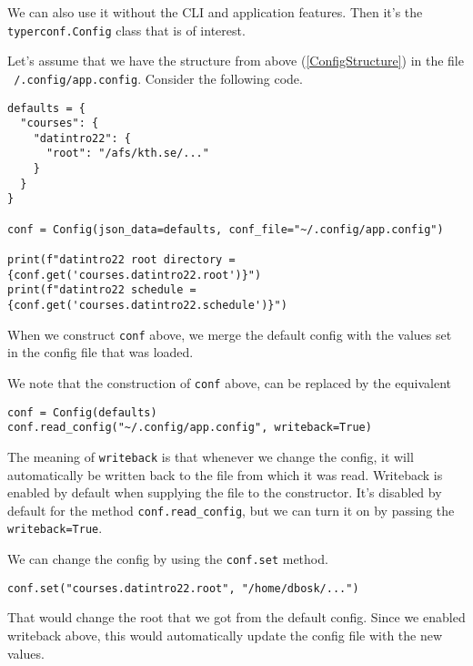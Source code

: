 We can also use it without the CLI and application features.
Then it's the \texttt{typerconf.Config} class that is of interest.

Let's assume that we have the structure from above (\cref{ConfigStructure}) in 
the file \texttt{~/.config/app.config}.
Consider the following code.
\begin{verbatim}
defaults = {
  "courses": {
    "datintro22": {
      "root": "/afs/kth.se/..."
    }
  }
}

conf = Config(json_data=defaults, conf_file="~/.config/app.config")

print(f"datintro22 root directory = {conf.get('courses.datintro22.root')}")
print(f"datintro22 schedule = {conf.get('courses.datintro22.schedule')}")
\end{verbatim}
When we construct \texttt{conf} above, we merge the default config 
with the values set in the config file that was loaded.

We note that the construction of \texttt{conf} above, can be 
replaced by the equivalent
\begin{verbatim}
conf = Config(defaults)
conf.read_config("~/.config/app.config", writeback=True)
\end{verbatim}
The meaning of \texttt{writeback} is that whenever we change the 
config, it will automatically be written back to the file from which it was 
read.
Writeback is enabled by default when supplying the file to the constructor.
It's disabled by default for the method \texttt{conf.read_config}, 
but we can turn it on by passing the \texttt{writeback=True}.

We can change the config by using the \texttt{conf.set} method.
\begin{verbatim}
conf.set("courses.datintro22.root", "/home/dbosk/...")
\end{verbatim}
That would change the root that we got from the default config.
Since we enabled writeback above, this would automatically update the config 
file with the new values.

